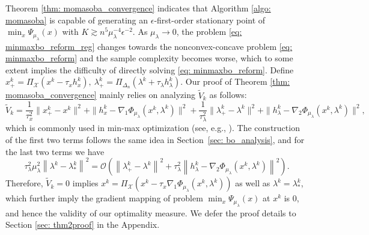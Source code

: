 \documentclass[10pt]{article}
\theoremstyle{remark}
\newcommand{\cO}{\mathcal{O}}
\newcommand{\cX}{\mathcal{X}}
\newcommand{\norm}[1]{\left\|#1\right\|}
\begin{document}
Theorem \ref{thm: momasoba_convergence} indicates that Algorithm \ref{algo: momasoba} is capable of generating an $\epsilon$-first-order stationary point of $\min_x \Psi_{\mu_{\lambda}}(x)$ with $K\gtrsim n^5\mu_{\lambda}^{-4}\epsilon^{-2}$. As $\mu_{\lambda}\rightarrow 0$, the problem \eqref{eq: minmaxbo_reform_reg} changes towards the nonconvex-concave problem \eqref{eq: minmaxbo_reform} and the sample complexity becomes worse, which to some extent implies the difficulty of directly solving \eqref{eq: minmaxbo_reform}. Define $x_+^k = \Pi_{\cX}(x^k - \tau_x h_x^k),\ \lambda_+^k = \Pi_{\Delta_n}(\lambda^k + \tau_{\lambda}h_{\lambda}^k)$. Our proof of Theorem \ref{thm: momasoba_convergence} mainly relies on analyzing $\tilde V_k$ as follows:
\[
    \tilde V_k = \frac{1}{\tau_x^2}\|x_+^k - x^k\|^2 + \|h_x^k - \nabla_1\Phi_{\mu_{\lambda}}(x^k,\lambda^k)\|^2 + \frac{1}{\tau_{\lambda}^2}\|\lambda_+^k  - \lambda^k\|^2 + \|h_{\lambda}^k - \nabla_2\Phi_{\mu_{\lambda}}(x^k, \lambda^k)\|^2,
\]
which is commonly used in min-max optimization (see, e.g., \cite{qiu2020single}). The construction of the first two terms follows the same idea in Section~\ref{sec: bo_analysis}, and for the last two terms we have
\[
    \tau_{\lambda}^2\mu_{\lambda}^2\norm{\lambda^k - \lambda_*^k}^2 = \cO\left(\norm{\lambda_+^k - \lambda^k}^2 + \tau_{\lambda}^2\norm{h_{\lambda}^k - \nabla_2\Phi_{\mu_{\lambda}}(x^k, \lambda^k)}^2\right).
\]
Therefore, $\tilde V_k = 0$ implies $x^k = \Pi_{\cX}\left(x^k - \tau_x\nabla_1\Phi_{\mu_{\lambda}}(x^k, \lambda^k)\right)$ as well as $\lambda^k = \lambda_*^k$, which further imply the gradient mapping of problem $\min_x\Psi_{\mu_{\lambda}}(x)$ at $x^k$ is $0$, and hence the validity of our optimality measure. We defer the proof details to Section \ref{sec: thm2proof} in the Appendix. 
\end{document}
